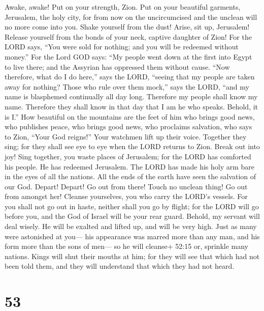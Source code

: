  Awake, awake! Put on your strength, Zion. Put on your
beautiful garments, Jerusalem, the holy city, for from now on the
uncircumcised and the unclean will no more come into you. 
Shake yourself from the dust! Arise, sit up, Jerusalem! Release yourself
from the bonds of your neck, captive daughter of Zion!  For
the LORD says, ``You were sold for nothing; and you will be redeemed
without money.''  For the Lord GOD says: ``My people went
down at the first into Egypt to live there; and the Assyrian has
oppressed them without cause.  ``Now therefore, what do I do
here,'' says the LORD, ``seeing that my people are taken away for
nothing? Those who rule over them mock,'' says the LORD, ``and my name
is blasphemed continually all day long.  Therefore my people
shall know my name. Therefore they shall know in that day that I am he
who speaks. Behold, it is I.''  How beautiful on the
mountains are the feet of him who brings good news, who publishes peace,
who brings good news, who proclaims salvation, who says to Zion, ``Your
God reigns!''  Your watchmen lift up their voice. Together
they sing; for they shall see eye to eye when the LORD returns to Zion.
 Break out into joy! Sing together, you waste places of
Jerusalem; for the LORD has comforted his people. He has redeemed
Jerusalem.  The LORD has made his holy arm bare in the eyes
of all the nations. All the ends of the earth have seen the salvation of
our God.  Depart! Depart! Go out from there! Touch no
unclean thing! Go out from amongst her! Cleanse yourselves, you who
carry the LORD's vessels.  For you shall not go out in
haste, neither shall you go by flight; for the LORD will go before you,
and the God of Israel will be your rear guard.  Behold, my
servant will deal wisely. He will be exalted and lifted up, and will be
very high.  Just as many were astonished at you--- his
appearance was marred more than any man, and his form more than the sons
of men---  so he will cleanse+ 52:15 or, sprinkle many
nations. Kings will shut their mouths at him; for they will see that
which had not been told them, and they will understand that which they
had not heard.

\hypertarget{section-49}{%
\section{53}\label{section-49}}

